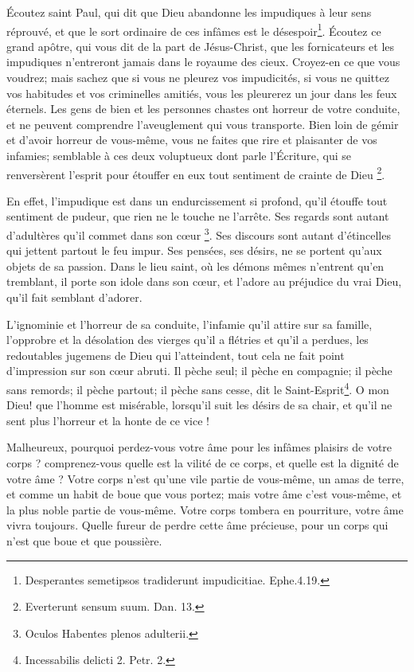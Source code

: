 \documentclass[instructions.tex]{subfiles}
\begin{document}
Écoutez saint Paul, qui dit que Dieu abandonne les impudiques à leur sens réprouvé, et que le sort ordinaire de ces infâmes est le désespoir\footnote{Desperantes semetipsos tradiderunt impudicitiae. Ephe.4.19.}. Écoutez ce grand apôtre, qui vous dit de la part de Jésus-Christ, que les fornicateurs et les impudiques n’entreront jamais dans le royaume des cieux. Croyez-en ce que vous voudrez; mais sachez que si vous ne pleurez vos impudicités, si vous ne quittez vos habitudes et vos criminelles amitiés, vous les pleurerez un jour dans les feux éternels. Les gens de bien et les personnes chastes ont horreur de votre conduite, et ne peuvent comprendre l’aveuglement qui vous transporte. Bien loin de gémir et d’avoir horreur de vous-même, vous ne faites que rire et plaisanter de vos infamies; semblable à ces deux voluptueux dont parle l’Écriture, qui se renversèrent l’esprit pour étouffer en eux tout sentiment de crainte de Dieu \footnote{Everterunt sensum suum. Dan. 13.}.
 
En effet, l’impudique est dans un endurcissement si profond, qu’il étouffe tout sentiment de pudeur, que rien ne le touche ne l’arrête. Ses regards sont autant d’adultères qu’il commet dans son cœur \footnote{Oculos Habentes plenos adulterii.}. Ses discours sont autant d’étincelles qui jettent partout le feu impur. Ses pensées, ses désirs, ne se portent qu’aux objets de sa passion. Dans le lieu saint, où les démons mêmes n’entrent qu’en tremblant, il porte son idole dans son cœur, et l’adore au préjudice du vrai Dieu, qu’il fait semblant d’adorer.
 
L’ignominie et l’horreur de sa conduite, l’infamie qu’il attire sur sa famille, l’opprobre et la désolation des vierges qu’il a flétries et qu’il a perdues, les redoutables jugemens de Dieu qui l’atteindent, tout cela ne fait point d’impression sur son cœur abruti. Il pèche seul; il pèche en compagnie; il pèche sans remords; il pèche partout; il pèche sans cesse, dit le Saint-Esprit\footnote{Incessabilis delicti 2. Petr. 2.}. O mon Dieu! que l’homme est misérable, lorsqu’il suit les désirs de sa chair, et qu’il ne sent plus l’horreur et la honte de ce vice !
 
\tertio Malheureux, pourquoi perdez-vous votre âme pour les infâmes plaisirs de votre corps ? comprenez-vous quelle est la vilité de ce corps, et quelle est la dignité de votre âme ? Votre corps n’est qu’une vile partie de vous-même, un amas de terre, et comme un habit de boue que vous portez; mais votre âme c’est vous-même, et la plus noble partie de vous-même. Votre corps tombera en pourriture, votre âme vivra toujours. Quelle fureur de perdre cette âme précieuse, pour un corps qui n’est que boue et que poussière.
 
\end{document}
